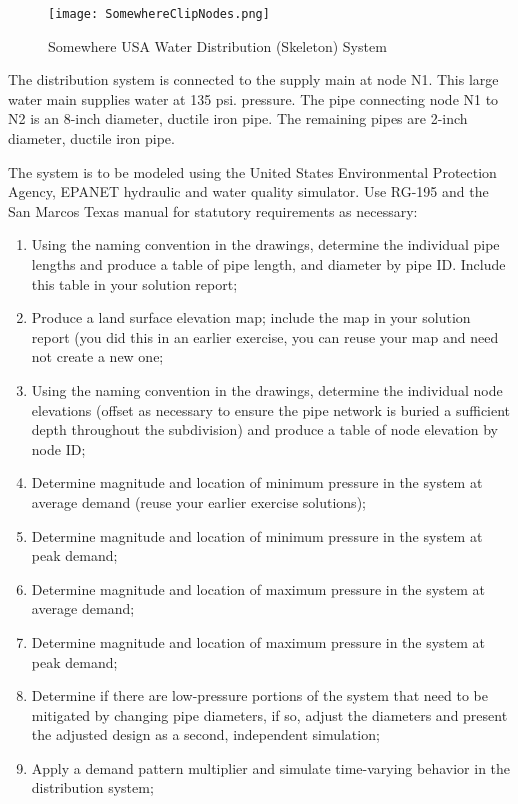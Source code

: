 \documentclass[12pt]{article}
\begin{document}
\begin{enumerate}
\begin{figure}[h!] %
   \centering
   \texttt{[image: SomewhereClipNodes.png]} 
   \caption{Somewhere USA Water Distribution (Skeleton) System}
   \label{fig:primary-network}
\end{figure}

The distribution system is connected to the supply main at node N1. 
This large water main supplies water at 135 psi. pressure. 
The pipe connecting node N1 to N2 is an 8-inch diameter, ductile iron pipe. The remaining pipes are 2-inch diameter, ductile iron pipe.

The system is to be modeled using the United States Environmental Protection Agency, EPANET  hydraulic and water quality simulator. Use RG-195 and the San Marcos Texas manual for statutory requirements as necessary:

\begin{enumerate}[1)]
\item Using the naming convention in the drawings, determine the individual pipe lengths and produce a table of pipe length, and diameter by pipe ID. Include this table in your solution report;
\item Produce a land surface elevation map; include the map in your solution report (you did this in an earlier exercise, you can reuse your map and need not create a new one;
\item Using the naming convention in the drawings, determine the individual node elevations (offset as necessary to ensure the pipe network is buried a sufficient depth throughout the subdivision) and produce a table of node elevation by node ID;
\item Determine magnitude and location of minimum pressure in the system at average demand (reuse your earlier exercise solutions);
\item Determine magnitude and location of minimum pressure in the system at peak demand;
\item Determine magnitude and location of maximum pressure in the system at average demand;
\item Determine magnitude and location of maximum pressure in the system at peak demand;
\item Determine if there are low-pressure portions of the system that need to be mitigated by changing pipe diameters, if so, adjust the diameters and present the adjusted design as a second, independent simulation;
\item Apply a demand pattern multiplier and simulate time-varying behavior in the distribution system;
\end{enumerate}

\end{enumerate}

%
%
%
\end{document}
